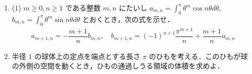 \documentclass[../../main.tex]{subfiles}
\begin{document}
\begin{enumerate}
  \item (1) $m \ge 0, n \ge 1$ である整数 $m, n$ にたいし $\displaystyle a_{m,n} = \int_0^\pi \theta^m \cos n\theta d\theta$, $\displaystyle b_{m,n} = \int_0^\pi \theta^m \sin n\theta d\theta$ とおくとき，次の式を示せ．
    \begin{align}
      a_{m+1,n} = -\dfrac{m+1}{n}b_{m,n}, \quad b_{m+1,n} = (-1)^{n+1}\dfrac{\pi^{m+1}}{n} + \dfrac{m+1}{n}a_{m,n}
    \end{align}

  \item 半径 $1$ の球体上の定点を端点とする長さ $\pi$ のひもを考える．このひもが球の外側の空間を動くとき，ひもの通過しうる領域の体積を求めよ．
\end{enumerate}
\end{document}

